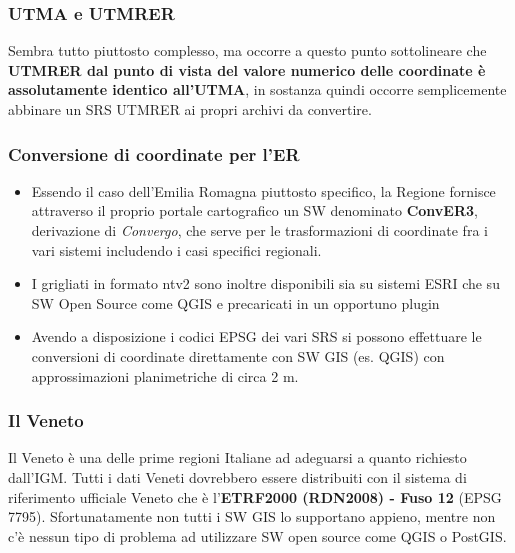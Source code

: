\documentclass{beamer}
\begin{document}
{\begin{frame}
\begin{itemize}
		
	\end{itemize}
	
\end{frame}

\begin{frame}
	\frametitle{UTMA e UTMRER}
	Sembra tutto piuttosto complesso, ma occorre a questo punto sottolineare che \textbf{UTMRER dal punto di vista del valore numerico delle coordinate è assolutamente identico all’UTMA}, in sostanza quindi occorre semplicemente abbinare un SRS UTMRER ai propri archivi da convertire.
\end{frame}

\begin{frame}
	\frametitle{Conversione di coordinate per l'ER}
	\begin{itemize}  
		\item Essendo il caso dell'Emilia Romagna piuttosto specifico, la Regione fornisce attraverso il proprio portale cartografico un SW denominato \textbf{ConvER3}, derivazione di \textit{Convergo}, che serve per le trasformazioni di coordinate fra i vari sistemi includendo i casi specifici regionali. 
		\item I grigliati in formato ntv2 sono inoltre disponibili sia su sistemi ESRI che su SW Open Source come QGIS e precaricati in un opportuno plugin
		\item Avendo a disposizione i codici EPSG dei vari SRS si possono effettuare le conversioni di coordinate direttamente con SW GIS (es. QGIS) con approssimazioni planimetriche di circa 2 m. 
	\end{itemize}   	
\end{frame}

\begin{frame}
	\frametitle{Il Veneto}
	Il Veneto è una delle prime regioni Italiane ad adeguarsi a quanto richiesto dall'IGM. 
	Tutti i dati Veneti dovrebbero essere distribuiti con il sistema di riferimento ufficiale Veneto che è l'\textbf{ETRF2000 (RDN2008) - Fuso 12} (EPSG 7795).
	Sfortunatamente non tutti i SW GIS lo supportano appieno, mentre non c'è nessun tipo di problema ad utilizzare SW open source come QGIS o PostGIS. 	
\end{frame}

}
\end{document}
